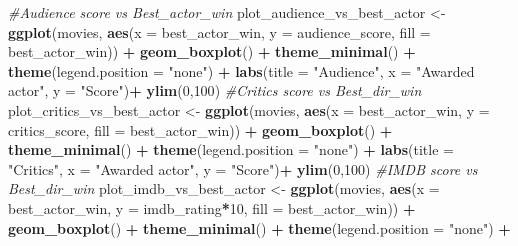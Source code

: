 \documentclass[]{article}
\newenvironment{Shaded}{\begin{snugshade}}{\end{snugshade}}
\newcommand{\KeywordTok}[1]{\textcolor[rgb]{0.13,0.29,0.53}{\textbf{#1}}}
\newcommand{\DataTypeTok}[1]{\textcolor[rgb]{0.13,0.29,0.53}{#1}}
\newcommand{\DecValTok}[1]{\textcolor[rgb]{0.00,0.00,0.81}{#1}}
\newcommand{\StringTok}[1]{\textcolor[rgb]{0.31,0.60,0.02}{#1}}
\newcommand{\CommentTok}[1]{\textcolor[rgb]{0.56,0.35,0.01}{\textit{#1}}}
\newcommand{\OperatorTok}[1]{\textcolor[rgb]{0.81,0.36,0.00}{\textbf{#1}}}
\newcommand{\NormalTok}[1]{#1}
\begin{document}
\begin{Shaded}
\begin{Highlighting}[]
\CommentTok{#Audience score vs Best_actor_win}
\NormalTok{plot_audience_vs_best_actor <-}
\StringTok{  }\KeywordTok{ggplot}\NormalTok{(movies,}
         \KeywordTok{aes}\NormalTok{(}\DataTypeTok{x =}\NormalTok{ best_actor_win, }\DataTypeTok{y =}\NormalTok{ audience_score, }\DataTypeTok{fill =}\NormalTok{ best_actor_win)) }\OperatorTok{+}
\StringTok{  }\KeywordTok{geom_boxplot}\NormalTok{() }\OperatorTok{+}
\StringTok{  }\KeywordTok{theme_minimal}\NormalTok{() }\OperatorTok{+}
\StringTok{  }\KeywordTok{theme}\NormalTok{(}\DataTypeTok{legend.position =} \StringTok{"none"}\NormalTok{) }\OperatorTok{+}
\StringTok{  }\KeywordTok{labs}\NormalTok{(}\DataTypeTok{title =} \StringTok{"Audience"}\NormalTok{, }\DataTypeTok{x =} \StringTok{"Awarded actor"}\NormalTok{, }\DataTypeTok{y =} \StringTok{"Score"}\NormalTok{)}\OperatorTok{+}
\StringTok{  }\KeywordTok{ylim}\NormalTok{(}\DecValTok{0}\NormalTok{,}\DecValTok{100}\NormalTok{)}
\CommentTok{#Critics score vs Best_dir_win}
\NormalTok{plot_critics_vs_best_actor <-}
\StringTok{  }\KeywordTok{ggplot}\NormalTok{(movies,}
         \KeywordTok{aes}\NormalTok{(}\DataTypeTok{x =}\NormalTok{ best_actor_win, }\DataTypeTok{y =}\NormalTok{ critics_score, }\DataTypeTok{fill =}\NormalTok{ best_actor_win)) }\OperatorTok{+}
\StringTok{  }\KeywordTok{geom_boxplot}\NormalTok{() }\OperatorTok{+}
\StringTok{  }\KeywordTok{theme_minimal}\NormalTok{() }\OperatorTok{+}
\StringTok{  }\KeywordTok{theme}\NormalTok{(}\DataTypeTok{legend.position =} \StringTok{"none"}\NormalTok{) }\OperatorTok{+}\StringTok{ }
\StringTok{  }\KeywordTok{labs}\NormalTok{(}\DataTypeTok{title =} \StringTok{"Critics"}\NormalTok{, }\DataTypeTok{x =} \StringTok{"Awarded actor"}\NormalTok{, }\DataTypeTok{y =} \StringTok{"Score"}\NormalTok{)}\OperatorTok{+}
\StringTok{  }\KeywordTok{ylim}\NormalTok{(}\DecValTok{0}\NormalTok{,}\DecValTok{100}\NormalTok{)}
\CommentTok{#IMDB score vs Best_dir_win}
\NormalTok{plot_imdb_vs_best_actor <-}
\StringTok{  }\KeywordTok{ggplot}\NormalTok{(movies,}
         \KeywordTok{aes}\NormalTok{(}\DataTypeTok{x =}\NormalTok{ best_actor_win, }\DataTypeTok{y =}\NormalTok{ imdb_rating}\OperatorTok{*}\DecValTok{10}\NormalTok{, }\DataTypeTok{fill =}\NormalTok{ best_actor_win)) }\OperatorTok{+}
\StringTok{  }\KeywordTok{geom_boxplot}\NormalTok{() }\OperatorTok{+}
\StringTok{  }\KeywordTok{theme_minimal}\NormalTok{() }\OperatorTok{+}
\StringTok{  }\KeywordTok{theme}\NormalTok{(}\DataTypeTok{legend.position =} \StringTok{"none"}\NormalTok{) }\OperatorTok{+}

\end{Highlighting}
\end{Shaded}
\end{document}
